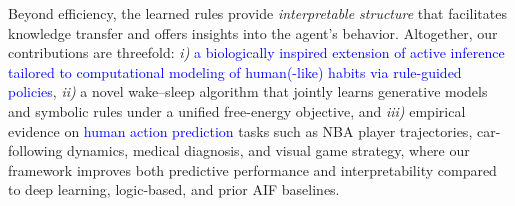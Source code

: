 \documentclass{article} %
\newcommand{\revise}[1]{\textcolor{blue}{#1}}
\begin{document}
Beyond efficiency, the learned rules provide \emph{interpretable structure} that facilitates knowledge transfer and offers insights into the agent’s behavior. Altogether, our contributions are threefold: {\it i)} \revise{a biologically inspired extension of active inference tailored to computational modeling of human(-like) habits via rule-guided policies}, {\it ii)} a novel wake--sleep algorithm that jointly learns generative models and symbolic rules under a unified free-energy objective, and {\it iii)} empirical evidence on \revise {human action prediction} tasks such as NBA player trajectories, car-following dynamics, medical diagnosis, and visual game strategy, where our framework improves both predictive performance and interpretability compared to deep learning, logic-based, and prior AIF baselines.


\end{document}
